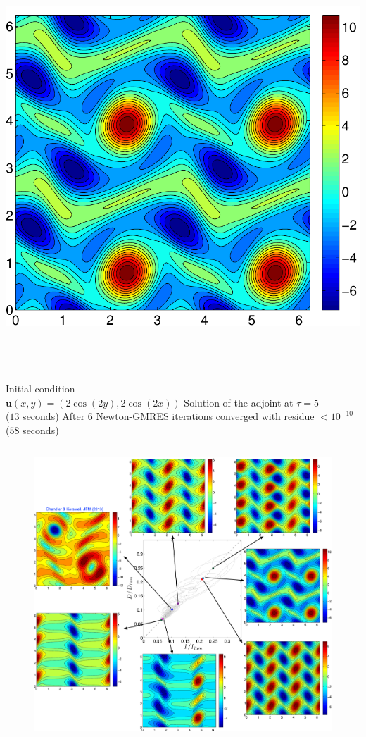 \documentclass[mathserif]{beamer} %
\newcommand{\vc}{\mathbf}
\begin{document}
\begin{frame}
\begin{columns}
		\centering
		\includegraphics[width=\textwidth]{Kol_R40_n128_vort_E2}
	\end{columns}
	\ \\
	{\tiny 
		\begin{columns}
			\centering
			Initial condition\\ $\vc u(x,y)=(2\cos(2y),2\cos(2x))$
			\centering
			Solution of the adjoint at $\tau = 5$\\ ($13$ seconds)
			\centering
			After $6$ Newton-GMRES iterations converged with residue $<10^{-10}$\\ ($58$ seconds)
		\end{columns}
	}
\end{frame}
%
\begin{frame}
\begin{figure}
\centering
\includegraphics[width=.9\textwidth]{ID_R40_mod}
\end{figure}
\end{frame}
\end{document}
